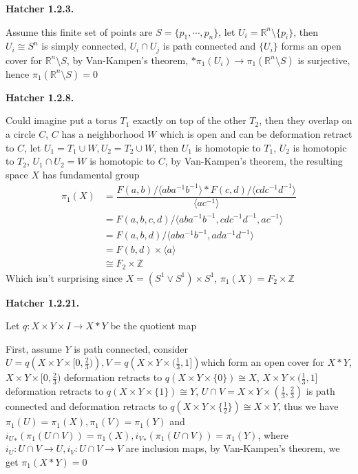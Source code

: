 \documentclass[../main.tex]{subfiles}
\begin{document}
\textbf{Hatcher 1.2.3.} \par
Assume this finite set of points are $S=\{p_1,\cdots,p_n\}$, let $U_i=\mathbb{R}^n\setminus\{p_i\}$, then $U_i\cong S^n$ is simply connected, $U_i\cap U_j$ is path connected and $\{U_i\}$ forms an open cover for $\mathbb{R}^n\setminus S$, by Van-Kampen's theorem, $*\pi_1(U_i)\rightarrow \pi_1(\mathbb{R}^n\setminus S)$ is surjective, hence $\pi_1(\mathbb{R}^n\setminus S)=0$ \par
\textbf{Hatcher 1.2.8.} \par
Could imagine put a torus $T_1$ exactly on top of the other $T_2$, then they overlap on a circle $C$, $C$ has a neighborhood $W$ which is open and can be deformation retract to $C$, let $U_1=T_1\cup W, U_2=T_2\cup W$, then $U_1$ is homotopic to $T_1$, $U_2$ is homotopic to $T_2$, $U_1\cap U_2=W$ is homotopic to $C$, by Van-Kampen's theorem, the resulting space $X$ has fundamental group
\[
\begin{aligned}
\pi_1(X)
&=\dfrac{F(a,b)/\langle aba^{-1}b^{-1}\rangle *F(c,d)/\langle cdc^{-1}d^{-1}\rangle}{\langle ac^{-1}\rangle} \\
&=F(a,b,c,d)/\langle aba^{-1}b^{-1},cdc^{-1}d^{-1},ac^{-1}\rangle \\
&=F(a,b,d)/\langle aba^{-1}b^{-1},ada^{-1}d^{-1}\rangle \\
&=F(b,d)\times \langle a\rangle \\
&\cong F_2\times \mathbb{Z}
\end{aligned}
\]
Which isn't surprising since $X=(S^1\vee S^1)\times S^1$, $\pi_1(X)=F_2\times \mathbb{Z}$ \par
\textbf{Hatcher 1.2.21.} \par
Let $q:X\times Y\times I\rightarrow X*Y$ be the quotient map \par
First, assume $Y$ is path connected, consider $U=q\left(X\times Y\times [0,\frac{2}{3})\right), V=q\left(X\times Y\times (\frac{1}{3},1]\right)$which form an open cover for $X*Y$, $X\times Y\times [0,\frac{2}{3})$ deformation retracts to $q(X\times Y\times \{0\})\cong X$, $X\times Y\times (\frac{1}{3},1]$ deformation retracts to $q(X\times Y\times \{1\})\cong Y$, $U\cap V=X\times Y\times (\frac{1}{3},\frac{2}{3})$ is path connected and deformation retracts to $q(X\times Y\times \{\frac{1}{2}\})\cong X\times Y$, thus we have $\pi_1(U)=\pi_1(X),\pi_1(V)=\pi_1(Y)$ and ${i_U}_*(\pi_1(U\cap V))=\pi_1(X), {i_V}_*(\pi_1(U\cap V))=\pi_1(Y)$, where $i_U:U\cap V\rightarrow U, i_V:U\cap V\rightarrow V$ are inclusion maps, by Van-Kampen's theorem, we get $\pi_1(X*Y)=0$ \par
\end{document}
